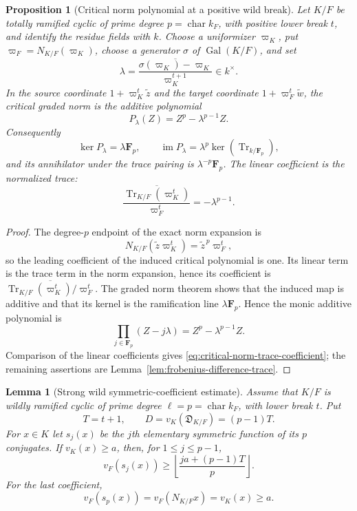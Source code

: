 \documentclass[11pt]{amsart}
\newtheorem{proposition}[theorem]{Proposition}
\newtheorem{lemma}[theorem]{Lemma}
\theoremstyle{definition}
\theoremstyle{remark}
\newcommand{\F}{\mathbf F}
\newcommand{\Tr}{\operatorname{Tr}}
\newcommand{\Gal}{\operatorname{Gal}}
\begin{document}
\begin{proposition}[Critical norm polynomial at a positive wild break]
\label{prop:critical-norm-polynomial}
Let $K/F$ be totally ramified cyclic of prime degree
$p=\operatorname{char}k_F$, with positive lower break $t$, and identify
the residue fields with $k$.
Choose a uniformizer $\varpi_K$, put
$\varpi_F=N_{K/F}(\varpi_K)$, choose a generator $\sigma$ of
$\Gal(K/F)$, and set
\[
 \lambda=
 \overline{\frac{\sigma(\varpi_K)-\varpi_K}
                   {\varpi_K^{t+1}}}\in k^\times.
\]
In the source coordinate $1+\varpi_K^t\widetilde z$ and the target
coordinate $1+\varpi_F^t\widetilde w$, the critical graded norm is the
additive polynomial
\begin{equation}\label{eq:critical-norm-polynomial-extracted}
 P_\lambda(Z)=Z^p-\lambda^{p-1}Z.
\end{equation}
Consequently
\[
 \ker P_\lambda=\lambda\F_p,
 \qquad
 \operatorname{im}P_\lambda
 =\lambda^p\ker\!\left(\Tr_{k/\F_p}\right),
\]
and its annihilator under the trace pairing is
$\lambda^{-p}\F_p$.  The linear coefficient is the normalized trace:
\begin{equation}\label{eq:critical-norm-trace-coefficient}
 \overline{\frac{\Tr_{K/F}(\varpi_K^t)}{\varpi_F^t}}
 =-\lambda^{p-1}.
\end{equation}
\end{proposition}

\begin{proof}
The degree-$p$ endpoint of the exact norm expansion is
\[
 N_{K/F}(\widetilde z\varpi_K^t)
 =\widetilde z^{\,p}\varpi_F^t,
\]
so the leading coefficient of the induced critical polynomial is one.
Its linear term is the trace term in the norm expansion, hence its
coefficient is
$\overline{\Tr_{K/F}(\varpi_K^t)/\varpi_F^t}$.  The graded norm theorem
shows that the induced map is additive and that its kernel is the
ramification line $\lambda\F_p$.  Hence the monic additive polynomial is
\[
 \prod_{j\in\F_p}(Z-j\lambda)
 =Z^p-\lambda^{p-1}Z.
\]
Comparison of the linear coefficients gives
\eqref{eq:critical-norm-trace-coefficient}; the remaining assertions are
Lemma~\ref{lem:frobenius-difference-trace}.
\end{proof}

\begin{lemma}[Strong wild symmetric-coefficient estimate]
\label{lem:wild-symmetric-bound}
Assume that $K/F$ is wildly ramified cyclic of prime degree
$\ell=p=\operatorname{char}k_F$, with lower break $t$.  Put
\[
 T=t+1,\qquad D=v_K(\mathfrak D_{K/F})=(p-1)T.
\]
For $x\in K$ let $s_j(x)$ be the $j$th elementary symmetric function
of its $p$ conjugates.  If $v_K(x)\ge a$, then, for
$1\le j\le p-1$,
\begin{equation}\label{eq:symmetric-bound}
 v_F(s_j(x))\ge
 \left\lfloor\frac{ja+(p-1)T}{p}\right\rfloor.
\end{equation}
For the last coefficient,
\begin{equation}\label{eq:symmetric-bound-last}
 v_F(s_p(x))=v_F(N_{K/F}x)=v_K(x)\ge a.
\end{equation}
\end{lemma}
\end{document}
